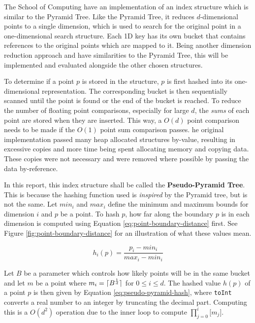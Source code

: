 The School of Computing have an implementation of an index structure which is similar to the Pyramid Tree. Like the Pyramid Tree, it reduces $d$-dimensional points to a single dimension, which is used to search for the original point in a one-dimensional search structure. Each 1D key has its own bucket that contains references to the original points which are mapped to it. Being another dimension reduction approach and have similarities to the Pyramid Tree, this will be implemented and evaluated alongside the other chosen structures. 

To determine if a point $p$ is stored in the structure, $p$ is first hashed into its one-dimensional representation. The corresponding bucket is then sequentially scanned until the point is found or the end of the bucket is reached. To reduce the number of floating point comparisons, especially for large $d$, the \textit{sums} of each point are stored when they are inserted. This way, a $O(d)$ point comparison needs to be made if the $O(1)$ point sum comparison passes. he original implementation passed many heap allocated structures by-value, resulting in excessive copies and more time being spent allocating memory and copying data. These copies were not necessary and were removed where possible by passing the data by-reference. 

In this report, this index structure shall be called the \textbf{Pseudo-Pyramid Tree}. This is because the hashing function used is \textit{inspired} by the Pyramid tree, but is not the same. Let $min_i$ and $max_i$ define the minimum and maximum bounds for dimension $i$ and $p$ be a point. To hash $p$, how far along the boundary $p$ is in each dimension is computed using Equation \ref{eq:point-boundary-distance} first. See Figure \ref{fig:point-boundary-distance} for an illustration of what these values mean.

\begin{equation}
	h_i(p) = \frac{p_i - min_i}{max_i - min_i}
	\label{eq:point-boundary-distance}
\end{equation}

Let $B$ be a parameter which controls how likely points will be in the same bucket and let $m$ be a point where $m_i = \lceil B^{\frac{1}{d}}\rceil$ for $0 \leq i \leq d$. The hashed value $h(p)$ of a point $p$ is then given by Equation \ref{eq:pseudo-pyramid-hash},  where \texttt{toInt} converts a real number to an integer by truncating the decimal part. Computing this is a $O(d^2)$ operation due to the inner loop to compute $\prod_{j=0}^{i}{\lbrack m_j \rbrack}$.

